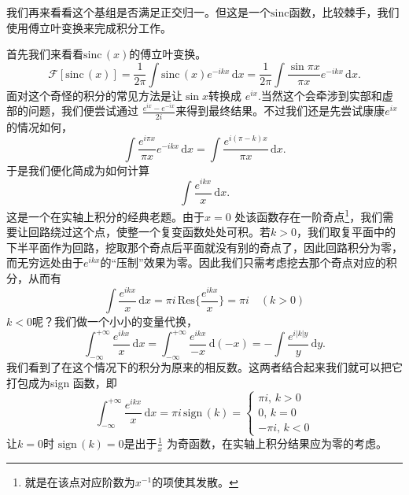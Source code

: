 \documentclass[12pt,a4paper,openany,twoside]{book}
\numberwithin{equation}{section}
\newcommand{\sinc}[1]{\mathrm{sinc} \, (#1)}
\begin{document}
      我们再来看看这个基组是否满足正交归一。但这是一个$\mathrm{sinc}$函数，比较棘手，我们使用傅立叶变换来完成积分工作。

      首先我们来看看$\sinc{x}$的傅立叶变换。
      \[
      	\mathcal{F}[\sinc{x}] =  \frac{1}{2\pi}\int \sinc{x} e^{-ikx} \, \mathrm{d}x  = \frac{1}{2\pi} \int \frac{\sin{\pi x}}{\pi x} e^{-ikx} \, \mathrm{d}x 
      .\]
      面对这个奇怪的积分的常见方法是让$\sin{x}$转换成 $e^{ix}$.当然这个会牵涉到实部和虚部的问题，我们便尝试通过 $\frac{e^{ix}-e^{-ix}}{2i}$来得到最终结果。不过我们还是先尝试康康$e^{ix}$的情况如何，
      \[
      	\int \frac{e^{i\pi x}}{\pi x}e^{-ikx} \, \mathrm{d}x = \int \frac{e^{i(\pi -k) x}}{\pi x} \, \mathrm{d} x
      .\]
      于是我们便化简成为如何计算
      \[
      	\int \frac{e^{ikx}}{x} \, \mathrm{d}x 
      .\] 
      这是一个在实轴上积分的经典老题。由于$x=0$ 处该函数存在一阶奇点\footnote{就是在该点对应阶数为$x^{-1}$的项使其发散。}，我们需要让回路绕过这个点，使整一个复变函数处处可积。若$k>0$，我们取复平面中的下半平面作为回路，挖取那个奇点后平面就没有别的奇点了，因此回路积分为零，而无穷远处由于$e^{ikx}$的``压制''效果为零。因此我们只需考虑挖去那个奇点对应的积分，从而有
      \begin{equation}
      	\int \frac{e^{ikx}}{x} \, \mathrm{d}x =  \pi i \, \mathrm{Res}\{\frac{e^{ikx}}{x}\} = \pi i \quad (k>0)
      \end{equation}
      $k<0$呢？我们做一个小小的变量代换，
      \[
       \int_{-\infty}^{+\infty} \frac{e^{ikx}}{x} \, \mathrm{d}x = \int_{-\infty}^{+\infty} \frac{e^{ikx}}{-x} \, \mathrm{d}(-x) =- \int \frac{e^{i|k|y}}{y} \, \mathrm{d} y   
      .\] 
      我们看到了在这个情况下的积分为原来的相反数。这两者结合起来我们就可以把它打包成为sign 函数，即
      \begin{equation}
      	\int _{-\infty} ^{+\infty} \frac{e^{ikx}}{x} \, \mathrm{d}x = \pi i \, \mathrm{sign}\,(k) = 
      	\begin{cases}
      	 \pi i, \, k>0 \\
      		0, \, k=0 \\
      		-\pi i, \, k<0
      	\end{cases}
      \end{equation}
      让$k=0$时 $\mathrm{sign}\,(k)=0$是出于$\frac{1}{x}$ 为奇函数，在实轴上积分结果应为零的考虑。
\end{document}
